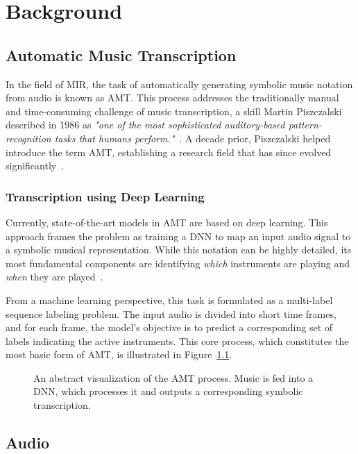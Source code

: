 \chapter{Background}\label{Background}

\section{Automatic Music Transcription}

In the field of \acrfull{MIR}, the task of automatically generating symbolic music notation from audio is known as \acrfull{AMT}. This process addresses the traditionally manual and time-consuming challenge of music transcription, a skill Martin Piszczalski described in 1986 as \textit{"one of the most sophisticated auditory-based pattern-recognition tasks that humans perform."}~\cite{10.5555/15202}. A decade prior, Piszczalski helped introduce the term \gls{AMT}, establishing a research field that has since evolved significantly~\cite{piszczalski1977automatic}.

\subsection{Transcription using Deep Learning}
Currently, state-of-the-art models in \gls{AMT} are based on deep learning. This approach frames the problem as training a \gls{DNN} to map an input audio signal to a symbolic musical representation. While this notation can be highly detailed, its most fundamental components are identifying \textit{which} instruments are playing and \textit{when} they are played~\cite{8350302, signals4040042, jamshidi2024machine}.

From a machine learning perspective, this task is formulated as a multi-label sequence labeling problem. The input audio is divided into short time frames, and for each frame, the model's objective is to predict a corresponding set of labels indicating the active instruments. This core process, which constitutes the most basic form of \gls{AMT}, is illustrated in Figure~\ref{AMTFigure}.

\begin{figure}[H]
    \centering
    
    \caption{An abstract visualization of the \acrfull{AMT} process. Music is fed into a \acrlong{DNN}, which processes it and outputs a corresponding symbolic transcription.}
    \label{AMTFigure}
\end{figure}

\section{Audio}

